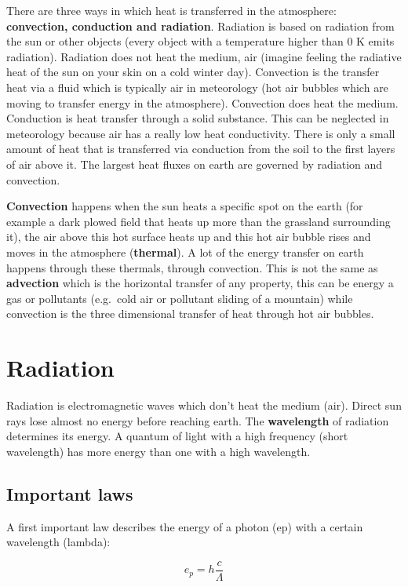 \documentclass[oneside]{book}
\begin{document}
There are three ways in which heat is transferred in the atmosphere:
\textbf{convection, conduction and radiation}. Radiation is based on
radiation from the sun or other objects (every object with a temperature
higher than 0 K emits radiation). Radiation does not heat the medium,
air (imagine feeling the radiative heat of the sun on your skin on a
cold winter day). Convection is the transfer heat via a fluid which is
typically air in meteorology (hot air bubbles which are moving to
transfer energy in the atmosphere). Convection does heat the medium.
Conduction is heat transfer through a solid substance. This can be
neglected in meteorology because air has a really low heat conductivity.
There is only a small amount of heat that is transferred via conduction
from the soil to the first layers of air above it. The largest heat
fluxes on earth are governed by radiation and convection.

\textbf{Convection} happens when the sun heats a specific spot on the
earth (for example a dark plowed field that heats up more than the
grassland surrounding it), the air above this hot surface heats up and
this hot air bubble rises and moves in the atmosphere
(\textbf{thermal}). A lot of the energy transfer on earth happens
through these thermals, through convection. This is not the same as
\textbf{advection} which is the horizontal transfer of any property,
this can be energy a gas or pollutants (e.g.~cold air or pollutant
sliding of a mountain) while convection is the three dimensional
transfer of heat through hot air bubbles.

\section{Radiation}\label{radiation}

Radiation is electromagnetic waves which don't heat the medium (air).
Direct sun rays lose almost no energy before reaching earth. The
\textbf{wavelength} of radiation determines its energy. A quantum of
light with a high frequency (short wavelength) has more energy than one
with a high wavelength.

\subsection{Important laws}\label{important-laws}

A first important law describes the energy of a photon (ep) with a
certain wavelength (lambda):

\begin{equation} 
  e_p = h  \frac{c}{\Lambda}
  \label{eq:Eq1}
\end{equation}
\end{document}
